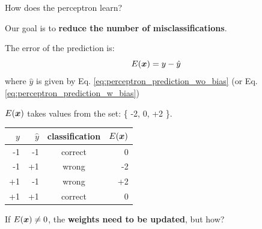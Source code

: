 \begin{frame}[t]{How does the perceptron learn?}

    Our goal is to {\bf reduce the number of misclassifications}.\\
    \vspace{0.3cm}

    The error of the prediction is:
    \begin{equation}
        E(\boldsymbol{x}) = y - \hat{y}
        \label{eq:perceptron_prediction_error}
    \end{equation}        
    where $\hat{y}$ is given by Eq. \ref{eq:perceptron_prediction_wo_bias} 
    (or Eq. \ref{eq:perceptron_prediction_w_bias})\\
    \vspace{0.5cm}

    $E(\boldsymbol{x})$ takes values from the set: \{ -2, 0, +2 \}.\\
    \begin{center}
        \begin{tabular}{rrcr}
            \hline
            $y$  & $\hat{y}$ & classification & $E(\boldsymbol{x})$ \\
            \hline
            -1   & -1  &   correct &   0  \\
            -1   & +1  &   wrong   &  -2  \\
            +1   & -1  &   wrong   &  +2  \\
            +1   & +1  &   correct &   0  \\
            \hline
    \end{tabular}
    \end{center}

    If $E(\boldsymbol{x}) \ne 0$, the {\bf weights need to be updated}, but how?\\

\end{frame}

%
%
%

